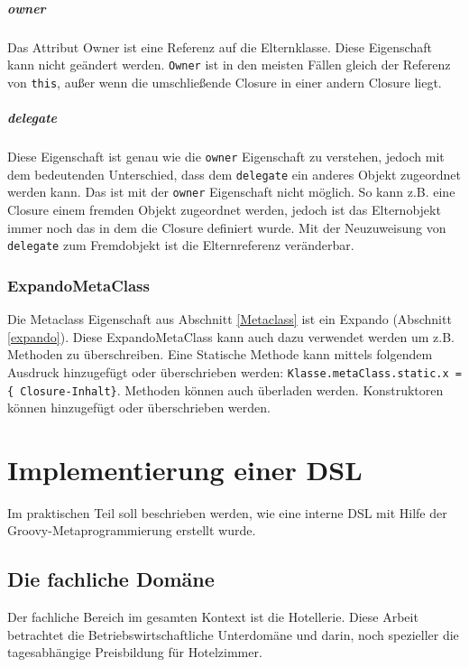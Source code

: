 \documentclass[11pt,english,ngerman, headsepline]{scrreprt}
\begin{document}
\paragraph{owner}
Das Attribut Owner ist eine Referenz auf die Elternklasse. Diese Eigenschaft
kann nicht geändert werden. \texttt{Owner} ist in den meisten Fällen gleich der
Referenz von  \texttt{this}, außer wenn die umschließende Closure in einer
andern Closure liegt.
\paragraph{delegate}
Diese Eigenschaft ist genau wie die \texttt{owner} Eigenschaft zu verstehen,
jedoch mit dem bedeutenden Unterschied, dass dem \texttt{delegate} ein anderes
Objekt zugeordnet werden kann. Das ist mit der \texttt{owner} Eigenschaft nicht
möglich. So kann z.B. eine Closure einem fremden Objekt zugeordnet werden,
jedoch ist das Elternobjekt immer noch das in dem die Closure definiert wurde.
Mit der Neuzuweisung von \texttt{delegate} zum Fremdobjekt ist die
Elternreferenz veränderbar.

\subsection{ExpandoMetaClass}

Die Metaclass Eigenschaft aus Abschnitt \ref{Metaclass} ist ein Expando
(Abschnitt \ref{expando}).
Diese ExpandoMetaClass kann auch dazu verwendet werden um z.B. Methoden zu
überschreiben. Eine Statische Methode kann mittels folgendem Ausdruck hinzugefügt
oder überschrieben werden: \texttt{Klasse.metaClass.static.x = \{
Closure-Inhalt\}}. 
Methoden können auch überladen werden. Konstruktoren können hinzugefügt oder
überschrieben werden. 
  

 


 
\chapter{Implementierung einer DSL }

Im praktischen Teil soll beschrieben werden, wie eine interne DSL mit Hilfe der
Groovy-Metaprogrammierung erstellt wurde.

\section{Die fachliche Domäne}
Der fachliche Bereich im gesamten Kontext ist die Hotellerie. Diese
Arbeit betrachtet die Betriebswirtschaftliche Unterdomäne
 und darin, noch spezieller die tagesabhängige Preisbildung für Hotelzimmer.
\end{document}
